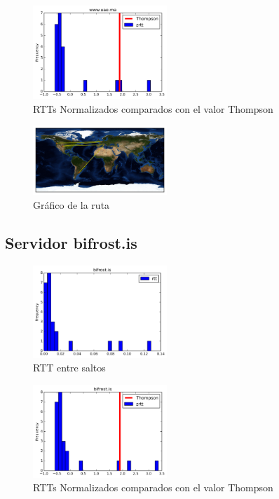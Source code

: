 \begin{figure}[H]
  \centering
    \includegraphics[width=0.45\textwidth]{histogramas_thompson/www-uae-ma.png}
  \caption{RTTs Normalizados comparados con el valor Thompson}
  \label{entropia-s}
\end{figure}

\begin{figure}[H]
  \centering
    \includegraphics[width=0.45\textwidth]{grafico-rutas/www-uae-ma.png}
  \caption{Gráfico de la ruta}
  \label{entropia-s}
\end{figure}




\subsection{Servidor bifrost.is}
\begin{figure}[H]
  \centering
    \includegraphics[width=0.45\textwidth]{histogramas_rtt/bifrost-is.png}
  \caption{RTT entre saltos}
  \label{entropia-s}
\end{figure}

\begin{figure}[H]
  \centering
    \includegraphics[width=0.45\textwidth]{histogramas_thompson/bifrost-is.png}
  \caption{RTTs Normalizados comparados con el valor Thompson}
  \label{entropia-s}
\end{figure}

